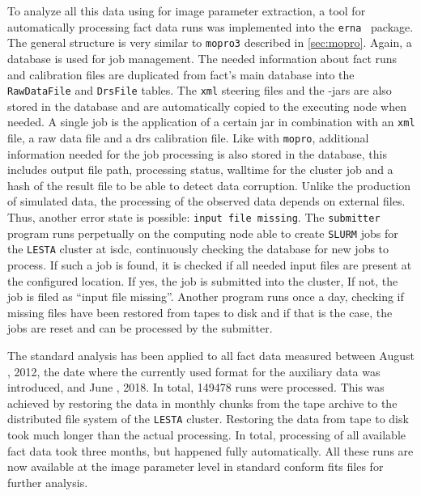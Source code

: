 To analyze all this data using \facttools{} for image parameter extraction,
a tool for automatically processing \gls{fact} data runs was implemented into
the \texttt{erna}~\cite{erna} package.
The general structure is very similar to \texttt{mopro3} described in \autoref{sec:mopro}.
Again, a database is used for job management. 
The needed information about \gls{fact} runs and calibration files are duplicated from \gls{fact}'s main database into the \texttt{RawDataFile} and \texttt{DrsFile} tables.
The \texttt{xml} steering files and the \facttools-jars are also stored in the database and
are automatically copied to the executing node when needed. 
A single \facttools{} job is the application of a certain \facttools{} jar in combination
with an \texttt{xml} file, a raw data file and a \gls{drs} calibration file.
Like with \texttt{mopro}, additional information needed for the job processing is
also stored in the database, this includes output file path, processing status,
walltime for the cluster job and a hash of the result file to be able to detect
data corruption.
Unlike the production of simulated data, the processing of the observed
data depends on external files.
Thus, another error state is possible: \texttt{input file missing}.
The \texttt{submitter} program runs perpetually on the computing node able to create \texttt{SLURM} jobs for the \texttt{LESTA} cluster at \gls{isdc},
continuously checking the database for new jobs to process.
If such a job is found, it is checked if all needed input files are present at
the configured location. 
If yes, the job is submitted into the cluster,
If not, the job is filed as \enquote{input file missing}.
Another program runs once a day, checking if missing files have been restored from
tapes to disk and if that is the case, the jobs are reset and can be processed by 
the submitter.

The \facttools{} standard analysis has been applied to all \gls{fact} data measured
between August , 2012, the date where the currently used format for the
auxiliary data was introduced, and June , 2018.
In total, \num{149478} runs were processed.
This was achieved by restoring the data in monthly chunks from the tape archive 
to the distributed file system of the \texttt{LESTA} cluster.
Restoring the data from tape to disk took much longer than the actual processing.
In total, processing of all available \gls{fact} data took three months,
but happened fully automatically.
All these runs are now available at the image parameter level in standard conform
\gls{fits} files for further analysis.

